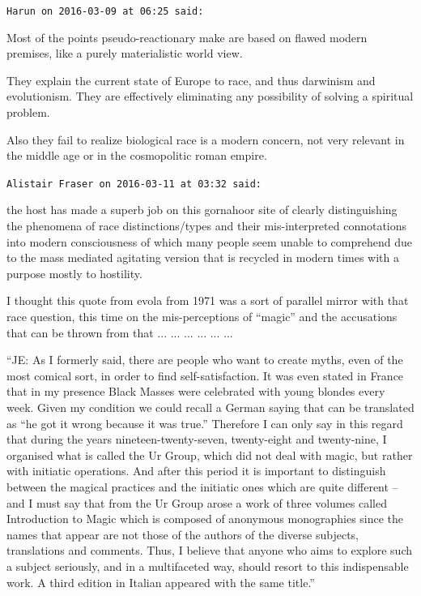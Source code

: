 \begin{footnotesize}
\begin{sffamily}
\texttt{Harun on 2016-03-09 at 06:25 said:}

Most of the points pseudo-reactionary make are based on flawed modern premises, like a purely materialistic world view.

They explain the current state of Europe to race, and thus darwinism and evolutionism. They are effectively eliminating any possibility of solving a spiritual problem.

Also they fail to realize biological race is a modern concern, not very relevant in the middle age or in the cosmopolitic roman empire.


\hfill

\texttt{Alistair Fraser on 2016-03-11 at 03:32 said:}

the host has made a superb job on this gornahoor site of clearly distinguishing the phenomena of race distinctions/types and their mis-interpreted connotations into modern consciousness of which many people seem unable to comprehend due to the mass mediated agitating version that is recycled in modern times with a purpose mostly to hostility.

I thought this quote from evola from 1971 was a sort of parallel mirror with that race question, this time on the mis-perceptions of ``magic'' and the accusations that can be thrown from that
... ... ... ... ... ...

``JE: As I formerly said, there are people who want to create myths, even of the most comical sort, in order to find self-satisfaction. It was even stated in France that in my presence Black Masses were celebrated with young blondes every week. Given my condition we could recall a German saying that can be translated as ``he got it wrong because it was true.'' Therefore I can only say in this regard that during the years nineteen-twenty-seven, twenty-eight and twenty-nine, I organised what is called the Ur Group, which did not deal with magic, but rather with initiatic operations. And after this period it is important to distinguish between the magical practices and the initiatic ones which are quite different -- and I must say that from the Ur Group arose a work of three volumes called Introduction to Magic which is composed of anonymous monographies since the names that appear are not those of the authors of the diverse subjects, translations and comments. Thus, I believe that anyone who aims to explore such a subject seriously, and in a multifaceted way, should resort to this indispensable work. A third edition in Italian appeared with the same title.''

\end{sffamily}
\end{footnotesize}

